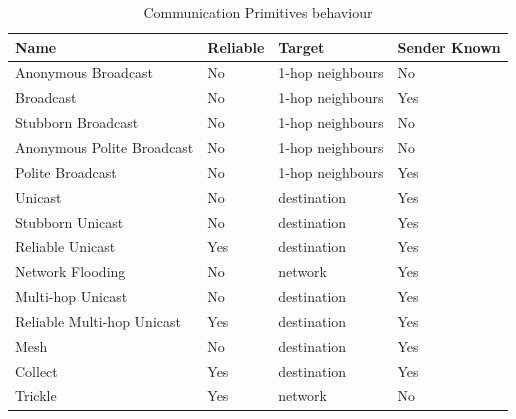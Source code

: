 \begin{table}[H]
	\centering
	\begin{tabular}{ | l | l | l | l | }
		\hline
		Name & Reliable & Target & Sender Known\\
		\hline
		Anonymous Broadcast & No & 1-hop neighbours & No\\
		Broadcast & No & 1-hop neighbours & Yes\\
		Stubborn Broadcast & No & 1-hop neighbours & No\\
		Anonymous Polite Broadcast & No & 1-hop neighbours & No\\
		Polite Broadcast & No & 1-hop neighbours & Yes\\
		Unicast & No & destination & Yes\\
		Stubborn Unicast & No & destination & Yes\\
		Reliable Unicast & Yes & destination & Yes\\
		Network Flooding & No & network & Yes\\
		Multi-hop Unicast & No & destination & Yes\\
		Reliable Multi-hop Unicast & Yes & destination & Yes\\
		\hline
		\hline
		Mesh & No & destination & Yes \\
		Collect & Yes & destination & Yes \\
		Trickle & Yes & network & No \\
		\hline
	\end{tabular}
	\caption{Communication Primitives behaviour}
\end{table}

